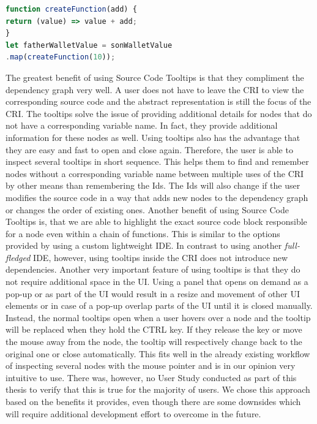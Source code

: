 \begin{lstlisting}[language=JavaScript, caption={Example of using a creation function in RxJS.},label={lst:NonLambdaCallback}]
function createFunction(add) {
return (value) => value + add;
}
let fatherWalletValue = sonWalletValue
.map(createFunction(10));
\end{lstlisting}
The greatest benefit of using Source Code Tooltips is that they compliment the dependency graph very well. A user does not have to leave the CRI to view the corresponding source code and the abstract representation is still the focus of the CRI. The tooltips solve the issue of providing additional details for nodes that do not have a corresponding variable name. In fact, they provide additional information for these nodes as well. Using tooltips also has the advantage that they are easy and fast to open and close again. Therefore, the user is able to inspect several tooltips in short sequence. This helps them to find and remember nodes without a corresponding variable name between multiple uses of the CRI by other means than remembering the Ids. The Ids will also change if the user modifies the source code in a way that adds new nodes to the dependency graph or changes the order of existing ones. Another benefit of using Source Code Tooltips is, that we are able to highlight the exact source code block responsible for a node even within a chain of functions. This is similar to the options provided by using a custom lightweight IDE. In contrast to using another \emph{full-fledged} IDE, however, using tooltips inside the CRI does not introduce new dependencies. Another very important feature of using tooltips is that they do not require additional space in the UI. Using a panel that opens on demand as a pop-up or as part of the UI would result in a resize and movement of other UI elements or in case of a pop-up overlap parts of the UI until it is closed manually. Instead, the normal tooltips open when a user hovers over a node and the tooltip will be replaced when they hold the CTRL key. If they release the key or move the mouse away from the node, the tooltip will respectively change back to the original one or close automatically. This fits well in the already existing workflow of inspecting several nodes with the mouse pointer and is in our opinion very intuitive to use. There was, however, no User Study conducted as part of this thesis to verify that this is true for the majority of users. We chose this approach based on the benefits it provides, even though there are some downsides which will require additional development effort to overcome in the future.
			
